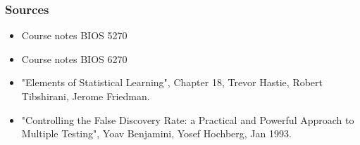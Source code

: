 \documentclass[11pt]{beamer}
\begin{document}
\begin{frame}
\frametitle{Sources}
{
\begin{itemize}
\item Course notes BIOS 5270 \\
\item Course notes BIOS 6270 \\
\item "Elements of Statistical Learning", Chapter 18, Trevor Hastie, Robert Tibshirani, Jerome Friedman. \\
\item "Controlling the False Discovery Rate: a Practical and Powerful Approach to Multiple Testing", Yoav Benjamini, Yosef Hochberg, Jan 1993.
\end{itemize}
}
\end{frame}
\end{document}
